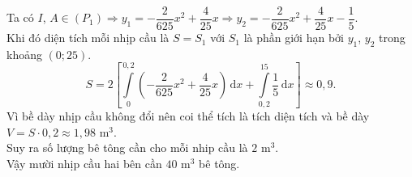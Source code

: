 \begin{bt}
{{
		}\noindent
		Ta có $I$, $A\in (P_1)\Rightarrow y_1=-\dfrac{2}{625}x^2+\dfrac{4}{25}x\Rightarrow y_2=-\dfrac{2}{625}x^2+\dfrac{4}{25}x-\dfrac{1}{5}$.\\
		Khi đó diện tích mỗi nhịp cầu là $S=S_1$ với $S_1$ là phần giới hạn bởi $y_1$, $y_2$ trong khoảng $(0;25)$.
		$$S=2\left[\int\limits_0^{0{,}2}\left(-\dfrac{2}{625}x^2+\dfrac{4}{25}x\right)\mathrm{\,d}x+\int\limits_{0{,}2}^{15}\dfrac{1}{5}\mathrm{\,d}x\right]\approx 0{,}9.$$
		Vì bề dày nhịp cầu không đổi nên coi thể tích là tích diện tích và bề dày $V=S\cdot 0{,}2\approx 1{,}98$ m$^3$.\\
		Suy ra số lượng bê tông cần cho mỗi nhip cầu là $2$ m$^3$.\\ Vậy mười nhịp cầu hai bên cần $40$ m$^3$ bê tông.
	}
\end{bt}

